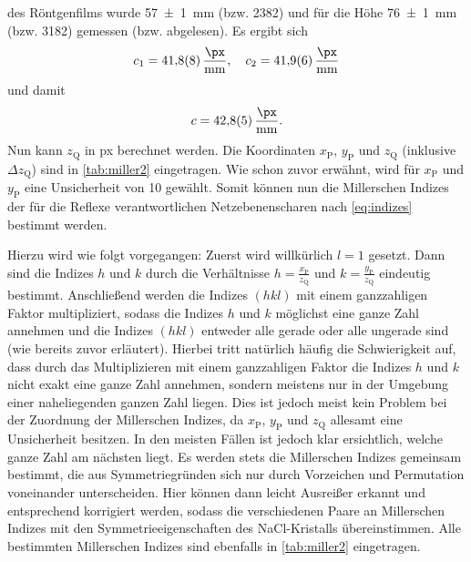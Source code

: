 des Röntgenfilms wurde \SI{57(1)}{\milli \meter} (bzw. \SI{2382}{\px}) und für die Höhe \SI{76(1)}{\milli \meter} (bzw. \SI{3182}{\px}) gemessen (bzw. abgelesen).
Es ergibt sich
\begin{equation*}
    c_1 = \SI{41,8(8)}{\frac{\px}{\milli \meter}} , \quad c_2 = \SI{41,9(6)}{\frac{\px}{\milli \meter}}
\end{equation*} und damit
\begin{equation*}
    c = \SI{42,8(5)}{\frac{\px}{\milli \meter}} .
\end{equation*} Nun kann $z_{\mathrm{Q}}$ in px berechnet werden. Die Koordinaten $x_{\mathrm{P}}$, $y_{\mathrm{P}}$ und $z_{\mathrm{Q}}$ (inklusive $\Delta z_{\mathrm{Q}}$) sind in \cref{tab:miller2} eingetragen.
Wie schon zuvor erwähnt, wird für $x_{\mathrm{P}}$ und $y_{\mathrm{P}}$ eine Unsicherheit von \SI{10}{\px} gewählt. Somit können nun die Millerschen Indizes der
für die Reflexe verantwortlichen Netzebenenscharen nach \cref{eq:indizes} bestimmt werden.\par
Hierzu wird wie folgt vorgegangen: Zuerst wird willkürlich $l = 1$ gesetzt. Dann
sind die Indizes $h$ und $k$ durch die Verhältnisse $h = \frac{x_{\mathrm{P}}}{z_{\mathrm{Q}}}$ und $k = \frac{y_{\mathrm{P}}}{z_{\mathrm{Q}}}$ eindeutig bestimmt. Anschließend
werden die Indizes $(hkl)$ mit einem ganzzahligen Faktor multipliziert, sodass die Indizes $h$ und $k$ möglichst eine ganze Zahl annehmen und die Indizes $(hkl)$ entweder
alle gerade oder alle ungerade sind (wie bereits zuvor erläutert). Hierbei tritt natürlich häufig die Schwierigkeit auf, dass durch das Multiplizieren mit einem ganzzahligen Faktor
die Indizes $h$ und $k$ nicht exakt eine ganze Zahl annehmen, sondern meistens nur in der Umgebung einer naheliegenden ganzen Zahl liegen. Dies ist jedoch meist kein Problem bei
der Zuordnung der Millerschen Indizes, da $x_{\mathrm{P}}$, $y_{\mathrm{P}}$ und $z_{\mathrm{Q}}$ allesamt eine Unsicherheit besitzen. In den meisten Fällen ist jedoch klar
ersichtlich, welche ganze Zahl am nächsten liegt. Es werden stets die Millerschen Indizes gemeinsam bestimmt, die aus Symmetriegründen sich nur durch Vorzeichen und Permutation voneinander
unterscheiden. Hier können dann leicht Ausreißer erkannt und entsprechend korrigiert werden, sodass die verschiedenen Paare an Millerschen Indizes mit den Symmetrieeigenschaften
des NaCl-Kristalls übereinstimmen. Alle bestimmten Millerschen Indizes sind ebenfalls in \cref{tab:miller2} eingetragen.\newpage
